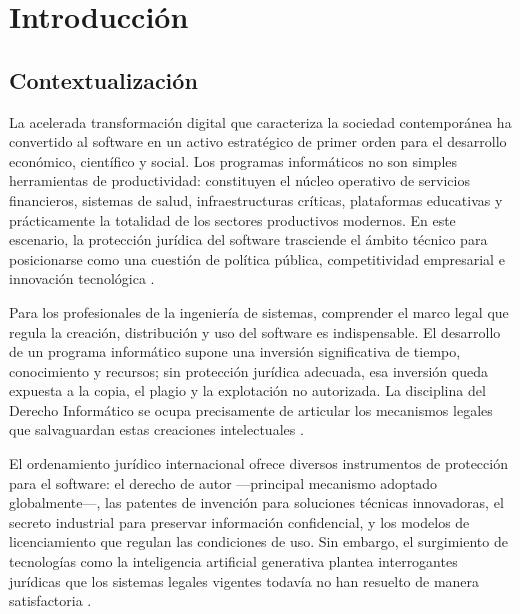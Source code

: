 \documentclass[11pt,a4paper]{report}
\begin{document}
\newpage
\thispagestyle{empty}
\tableofcontents

\newpage

\chapter*{Introducción}

\section*{Contextualización}

La acelerada transformación digital que caracteriza la sociedad contemporánea ha convertido al software en un activo estratégico de primer orden para el desarrollo económico, científico y social. Los programas informáticos no son simples herramientas de productividad: constituyen el núcleo operativo de servicios financieros, sistemas de salud, infraestructuras críticas, plataformas educativas y prácticamente la totalidad de los sectores productivos modernos. En este escenario, la protección jurídica del software trasciende el ámbito técnico para posicionarse como una cuestión de política pública, competitividad empresarial e innovación tecnológica \citep{ompi2024}.

Para los profesionales de la ingeniería de sistemas, comprender el marco legal que regula la creación, distribución y uso del software es indispensable. El desarrollo de un programa informático supone una inversión significativa de tiempo, conocimiento y recursos; sin protección jurídica adecuada, esa inversión queda expuesta a la copia, el plagio y la explotación no autorizada. La disciplina del Derecho Informático se ocupa precisamente de articular los mecanismos legales que salvaguardan estas creaciones intelectuales \citep{euipo2022}.

El ordenamiento jurídico internacional ofrece diversos instrumentos de protección para el software: el derecho de autor —principal mecanismo adoptado globalmente—, las patentes de invención para soluciones técnicas innovadoras, el secreto industrial para preservar información confidencial, y los modelos de licenciamiento que regulan las condiciones de uso. Sin embargo, el surgimiento de tecnologías como la inteligencia artificial generativa plantea interrogantes jurídicas que los sistemas legales vigentes todavía no han resuelto de manera satisfactoria \citep{ompi2024}.
\end{document}
